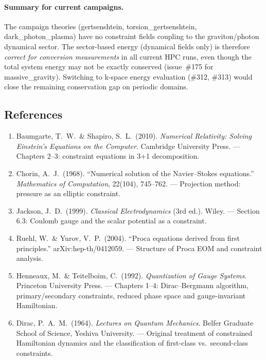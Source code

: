 \paragraph{Summary for current campaigns.}
The campaign theories (gertsenshtein, torsion\_gertsenshtein, dark\_photon\_plasma)
have no constraint fields coupling to the graviton/photon dynamical sector.
The sector-based energy (dynamical fields only) is therefore \emph{correct for
conversion measurements} in all current HPC runs, even though the total system
energy may not be exactly conserved (issue~\#175 for massive\_gravity).
Switching to k-space energy evaluation (\#312, \#313) would close the remaining
conservation gap on periodic domains.

\subsection{References}
\label{sec:cf-references}

\begin{enumerate}
  \item Baumgarte, T.\ W.\ \& Shapiro, S.\ L.\ (2010). \emph{Numerical Relativity: Solving
    Einstein's Equations on the Computer}. Cambridge University Press.
    --- Chapters 2--3: constraint equations in 3+1 decomposition.

  \item Chorin, A.\ J.\ (1968). ``Numerical solution of the Navier--Stokes equations.''
    \emph{Mathematics of Computation}, 22(104), 745--762.
    --- Projection method: pressure as an elliptic constraint.

  \item Jackson, J.\ D.\ (1999). \emph{Classical Electrodynamics} (3rd ed.). Wiley.
    --- Section 6.3: Coulomb gauge and the scalar potential as a constraint.

  \item Ruehl, W.\ \& Yurov, V.\ P.\ (2004). ``Proca equations derived from first
    principles.'' arXiv:hep-th/0412059.
    --- Structure of Proca EOM and constraint analysis.

  \item Henneaux, M.\ \& Teitelboim, C.\ (1992). \emph{Quantization of Gauge Systems}.
    Princeton University Press.
    --- Chapters 1--4: Dirac--Bergmann algorithm, primary/secondary constraints,
    reduced phase space and gauge-invariant Hamiltonian.

  \item Dirac, P.\ A.\ M.\ (1964). \emph{Lectures on Quantum Mechanics}. Belfer Graduate
    School of Science, Yeshiva University.
    --- Original treatment of constrained Hamiltonian dynamics and the classification
    of first-class vs.\ second-class constraints.
\end{enumerate}
